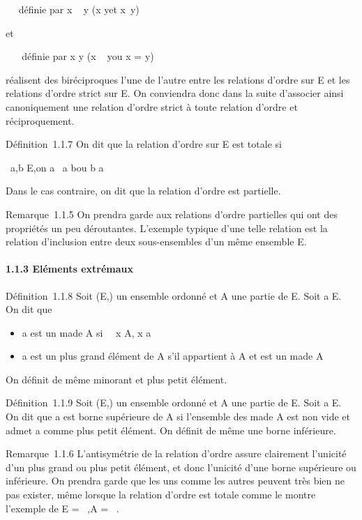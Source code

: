 \documentclass[]{article}
\begin{document}
\leqslant \mapsto~ \prec~\text définie par x \prec~
y \Leftrightarrow (x \leqslant y\text et
x\neq~y)

et

\prec~ \mapsto~ \leqslant\text définie par x \leqslant
y \Leftrightarrow (x \prec~ y\text ou x = y)

réalisent des bi\jmathections réciproques l'une de l'autre entre les
relations d'ordre sur E et les relations d'ordre strict sur E. On
conviendra donc dans la suite d'associer ainsi canoniquement une
relation d'ordre strict à toute relation d'ordre et réciproquement.

Définition~1.1.7 On dit que la relation d'ordre \leqslant sur E est totale si

\forall~a,b \in E,\text on a ~a \leqslant
b\text ou b \leqslant a

Dans le cas contraire, on dit que la relation d'ordre est partielle.

Remarque~1.1.5 On prendra garde aux relations d'ordre partielles qui ont
des propriétés un peu déroutantes. L'exemple typique d'une telle
relation est la relation d'inclusion entre deux sous-ensembles d'un même
ensemble E.

\paragraph{1.1.3 Eléments extrémaux}

Définition~1.1.8 Soit (E,\leqslant) un ensemble ordonné et A une partie de E.
Soit a \in E. On dit que

\begin{itemize}
\itemsep1pt\parskip0pt
\item
  a est un ma\jmathorant de A si \forall~~x \in A, x \leqslant a
\item
  a est un plus grand élément de A s'il appartient à A et est un
  ma\jmathorant de A
\end{itemize}

On définit de même minorant et plus petit élément.

Définition~1.1.9 Soit (E,\leqslant) un ensemble ordonné et A une partie de E.
Soit a \in E. On dit que a est borne supérieure de A si l'ensemble des
ma\jmathorants de A est non vide et admet a comme plus petit élément. On
définit de même une borne inférieure.

Remarque~1.1.6 L'antisymétrie de la relation d'ordre assure clairement
l'unicité d'un plus grand ou plus petit élément, et donc l'unicité d'une
borne supérieure ou inférieure. On prendra garde que les uns comme les
autres peuvent très bien ne pas exister, même lorsque la relation
d'ordre est totale comme le montre l'exemple de E = ~,A = ~.
\end{document}
